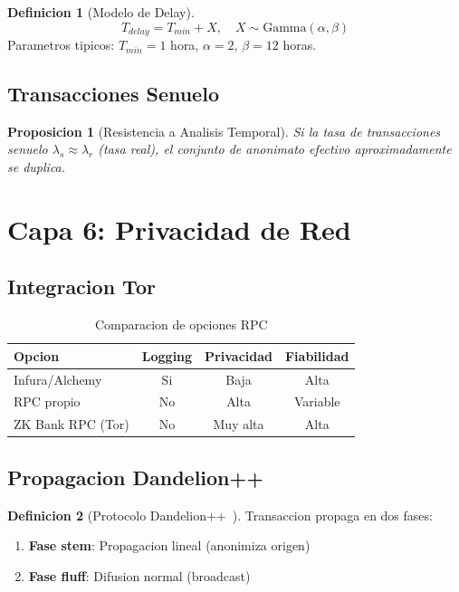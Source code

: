 \documentclass[11pt]{article}
\theoremstyle{definition}
\newtheorem{definicion}{Definicion}[section]
\theoremstyle{plain}
\newtheorem{proposicion}{Proposicion}[section]
\theoremstyle{remark}
\begin{document}
\begin{definicion}[Modelo de Delay]
\begin{equation}
T_{delay} = T_{min} + X, \quad X \sim \text{Gamma}(\alpha, \beta)
\end{equation}
Parametros tipicos: $T_{min} = 1$ hora, $\alpha = 2$, $\beta = 12$ horas.
\end{definicion}

\subsection{Transacciones Senuelo}

\begin{proposicion}[Resistencia a Analisis Temporal]
Si la tasa de transacciones senuelo $\lambda_s \approx \lambda_r$ (tasa real), el conjunto de anonimato efectivo aproximadamente se duplica.
\end{proposicion}

\section{Capa 6: Privacidad de Red}
\label{sec:layer6}

\subsection{Integracion Tor}

\begin{table}[H]
\centering
\caption{Comparacion de opciones RPC}
\label{tab:rpc}
\begin{tabular}{lccc}
\toprule
\textbf{Opcion} & \textbf{Logging} & \textbf{Privacidad} & \textbf{Fiabilidad} \\
\midrule
Infura/Alchemy & Si & Baja & Alta \\
RPC propio & No & Alta & Variable \\
ZK Bank RPC (Tor) & No & Muy alta & Alta \\
\bottomrule
\end{tabular}
\end{table}

\subsection{Propagacion Dandelion++}

\begin{definicion}[Protocolo Dandelion++~\cite{venkatakrishnan2017dandelion}]
Transaccion propaga en dos fases:
\begin{enumerate}
    \item \textbf{Fase stem}: Propagacion lineal (anonimiza origen)
    \item \textbf{Fase fluff}: Difusion normal (broadcast)
\end{enumerate}
\end{definicion}
\end{document}
